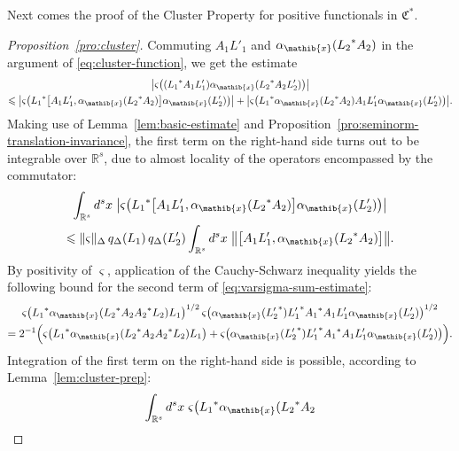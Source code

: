 \documentclass[a4paper,a4paper]{article}
\numberwithin{equation}{section}
\newcommand{\Rs}{\mathbb{R}^s}
\newcommand{\Cstar}{\mathfrak{C}^*}
\newcommand{\aibx}{\alpha_\mathib{x}}
\theoremstyle{definition}
\theoremstyle{plain}
\theoremstyle{remark}
\newcommand{\bcomm}[2]{\bigl[ #1 , #2 \bigr]}
\newcommand{\babs}[1]{\bigl\lvert #1 \bigr\rvert}
\newcommand{\norm}[1]{\lVert #1 \rVert}
\newcommand{\bnorm}[1]{\bigl\lVert #1 \bigr\rVert}
\newcommand{\qDx}[1]{q_\Delta ( #1 )}
\begin{document}
  Next comes the proof of the Cluster Property for positive
  functionals in $\Cstar$.
  \begin{proof}[Proposition~\ref{pro:cluster}]
    Commuting $A_1 L'_1$ and $\aibx ( {L_2}^* A_2 )$ in the argument
    of \eqref{eq:cluster-function}, we get the estimate
    \begin{multline}
      \label{eq:varsigma-sum-estimate}
      \babs{\varsigma \bigl( ( {L_1}^* A_1 L'_1 ) \aibx ( {L_2}^* A_2
      L'_2 ) \bigr)} \\
      \leqslant \babs{\varsigma \bigl( {L_1}^* \bcomm{A_1 L'_1}{\aibx
      ( {L_2}^* A_2 )} \aibx ( L'_2 ) \bigr)} + \babs{\varsigma
      \bigl( {L_1}^* \aibx ( {L_2}^* A_2 ) A_1 L'_1 \aibx ( L'_2 )
      \bigr)} \text{.}
    \end{multline}
    Making use of Lemma~\ref{lem:basic-estimate} and
    Proposition~\ref{pro:seminorm-translation-invariance}, the first
    term on the right-hand side turns out to be integrable over $\Rs$,
    due to almost locality of the operators encompassed by the
    commutator:
    \begin{multline}
      \label{eq:first-varsigmaintegral-estimate}
      \int_{\Rs} d^s x \; \babs{\varsigma \bigl( {L_1}^* \bcomm{A_1
      L'_1}{\aibx ( {L_2}^* A_2 )} \aibx ( L'_2 ) \bigr)} \\
      \leqslant \norm{\varsigma}_\Delta \, \qDx{L_1} \, \qDx{L'_2}
      \int_{\Rs} d^s x \; \bnorm{\bcomm{A_1 L'_1}{\aibx ( {L_2}^* A_2
      )}} \text{.}
    \end{multline}
    By positivity of $\varsigma$, application of the Cauchy-Schwarz
    inequality yields the following bound for the second term of
    \eqref{eq:varsigma-sum-estimate}:
    \begin{multline}
      \label{eq:varsigma-cauchy-schwarz}
      \varsigma \bigl( {L_1}^* \aibx ( {L_2}^* A_2 {A_2}^* L_2 ) L_1
      \bigr)^{1/2} \, \varsigma \bigl( \aibx ( {L'_2}^* ) {L'_1}^*
      {A_1}^* A_1 L'_1 \aibx ( L'_2 ) \bigr)^{1/2} \\
      = 2^{-1} \Bigl( \varsigma \bigl( {L_1}^* \aibx ( {L_2}^* A_2
      {A_2}^* L_2 ) L_1 \bigr) + \varsigma \bigl( \aibx ( {L'_2}^* )
      {L'_1}^* {A_1}^* A_1 L'_1 \aibx ( L'_2 ) \bigr) \Bigr) \text{.}
    \end{multline}
    Integration of the first term on the right-hand side is possible,
    according to Lemma~\ref{lem:cluster-prep}:
    \begin{equation}
      \label{eq:second-varsigmaintegral-estimate}
      \int_{\Rs} d^s x \; \varsigma \bigl( {L_1}^* \aibx ( {L_2}^* A_2

\end{equation}
\end{proof}
\end{document}
